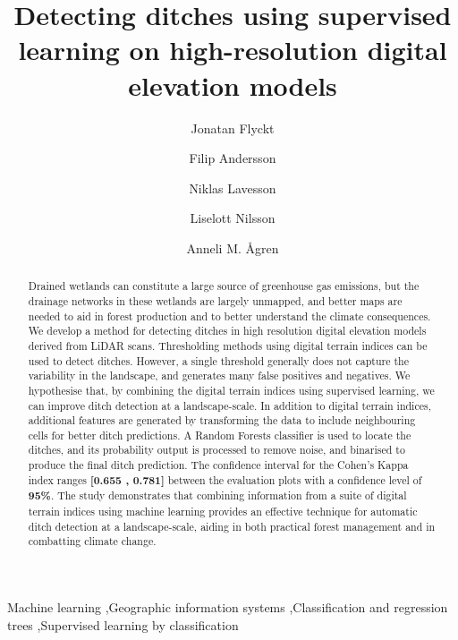 \documentclass[11pt, review]{elsarticle} %
\begin{document}
\begin{frontmatter}
\title{Detecting ditches using supervised learning on high-resolution digital elevation models}

\author[ju]{Jonatan Flyckt}

\author[ju]{Filip Andersson}

\author[ju]{Niklas Lavesson}

\author[fa]{Liselott Nilsson}

\author[slu]{Anneli M. \AA gren}

\address[ju]{Department of Computer Science, School of Engineering, J\"onk\"oping University, Gjuterigatan 5, 553 18, J\"onk\"oping, Sweden}
\address[fa]{Forest Department, Swedish Forest Agency, Skeppargatan 17, 931 32 Skellefte\aa, Sweden}
\address[slu]{Department of Forest Ecology and Management, Swedish University of Agricultural Sciences, SLU, Skogsmarksgr\"and 17, 901 83, Ume\aa, Sweden}

\begin{abstract}
{\footnotesize
Drained wetlands can constitute a large source of greenhouse gas emissions, but the drainage networks in these wetlands are largely unmapped, and better maps are needed to aid in forest production and to better understand the climate consequences. We develop a method for detecting ditches in high resolution digital elevation models derived from LiDAR scans. Thresholding methods using digital terrain indices can be used to detect ditches. However, a single threshold generally does not capture the variability in the landscape, and generates many false positives and negatives. We hypothesise that, by combining the digital terrain indices using supervised learning, we can improve ditch detection at a landscape-scale. In addition to digital terrain indices, additional features are generated by transforming the data to include neighbouring cells for better ditch predictions. A Random Forests classifier is used to locate the ditches, and its probability output is processed to remove noise, and binarised to produce the final ditch prediction. The confidence interval for the Cohen's Kappa index ranges \textbf{[0.655 , 0.781]} between the evaluation plots with a confidence level of \textbf{95\%}. The study demonstrates that combining information from  a suite of digital terrain indices using machine learning provides an effective technique for automatic ditch detection at a landscape-scale, aiding in both practical forest management and in combatting climate change.}
\end{abstract}

\begin{keyword}
{\footnotesize
Machine learning \sep Geographic information systems \sep Classification and regression trees \sep Supervised learning by classification}
\end{keyword}

\end{frontmatter}
\end{document}
